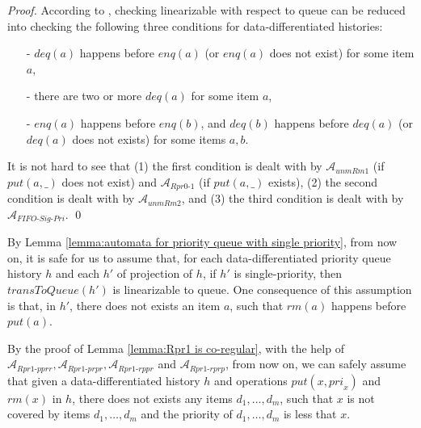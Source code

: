 \documentclass{llncs}
\begin{document}
\begin {proof}

According to \cite{Bouajjani:2015}, checking linearizable with respect to queue can be reduced into checking the following three conditions for data-differentiated histories:

\begin{itemize}
\setlength{\itemsep}{0.5pt}
\item[-] $\textit{deq}(a)$ happens before $\textit{enq}(a)$ (or $\textit{enq}(a)$ does not exist) for some item $a$,

\item[-] there are two or more $\textit{deq}(a)$ for some item $a$,

\item[-] $\textit{enq}(a)$ happens before $\textit{enq}(b)$, and $\textit{deq}(b)$ happens before $\textit{deq}(a)$ (or $\textit{deq}(a)$ does not exists) for some items $a,b$.
\end{itemize}

It is not hard to see that (1) the first condition is dealt with by $\mathcal{A}_{\textit{unmRm1}}$ (if $\textit{put}(a,\_)$ does not exist) and $\mathcal{A}_{\textit{Rpr0-1}}$ (if $\textit{put}(a,\_)$ exists), (2) the second condition is dealt with by $\mathcal{A}_{\textit{unmRm2}}$, and (3) the third condition is dealt with by $\mathcal{A}_{\textit{FIFO-Sig-Pri}}$. \qed
\end {proof}

By Lemma \ref{lemma:automata for priority queue with single priority}, from now on, it is safe for us to assume that, for each data-differentiated priority queue history $h$ and each $h'$ of projection of $h$, if $h'$ is single-priority, then $\textit{transToQueue}(h')$ is linearizable to queue. One consequence of this assumption is that, in $h'$, there does not exists an item $a$, such that $\textit{rm}(a)$ happens before $\textit{put}(a)$.

By the proof of Lemma \ref{lemma:Rpr1 is co-regular}, with the help of $\mathcal{A}_{\textit{Rpr1-pprr}}, \mathcal{A}_{\textit{Rpr1-prpr}}, \mathcal{A}_{\textit{Rpr1-rppr}}$ and $\mathcal{A}_{\textit{Rpr1-rprp}}$, from now on, we can safely assume that given a data-differentiated history $h$ and operations $\textit{put}(x,\textit{pri}_x)$ and $\textit{rm}(x)$ in $h$, there does not exists any items $d_1,\ldots,d_m$, such that $x$ is not covered by items $d_1,\ldots,d_m$ and the priority of $d_1,\ldots,d_m$ is less that $x$.
\end{document}
